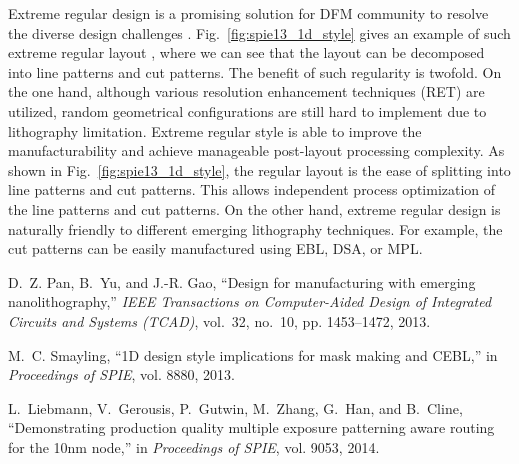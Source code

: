 Extreme regular design is a promising solution for DFM community to resolve the diverse design challenges
\cite{LITH_SPIE2014_Liebmann}.
Fig.~\ref{fig:spie13_1d_style} gives an example of such extreme regular layout \cite{CELL_SPIE2013_Smayling},
where we can see that the layout can be decomposed into line patterns and cut patterns.
The benefit of such regularity is twofold.
On the one hand, although various resolution enhancement techniques (RET) are utilized,
random geometrical configurations are still hard to implement due to lithography limitation.
Extreme regular style is able to improve the manufacturability and achieve manageable post-layout processing complexity.
As shown in Fig.~\ref{fig:spie13_1d_style}, the regular layout is the ease of splitting into line patterns and cut patterns.
This allows independent process optimization of the line patterns and cut patterns.
On the other hand, extreme regular design is naturally friendly to different emerging lithography techniques.
For example, the cut patterns can be easily manufactured using EBL, DSA, or MPL.



\begin{thebibliography}{10}

D.~Z. Pan, B.~Yu, and J.-R. Gao, ``Design for manufacturing with emerging
  nanolithography,'' \emph{IEEE Transactions on Computer-Aided Design of
  Integrated Circuits and Systems (TCAD)}, vol.~32, no.~10, pp. 1453--1472,
  2013.

M.~C. Smayling, ``{1D} design style implications for mask making and {CEBL},''
  in \emph{Proceedings of SPIE}, vol. 8880, 2013.

L.~Liebmann, V.~Gerousis, P.~Gutwin, M.~Zhang, G.~Han, and B.~Cline,
  ``Demonstrating production quality multiple exposure patterning aware routing
  for the 10nm node,'' in \emph{Proceedings of SPIE}, vol. 9053, 2014.


\end{thebibliography}

